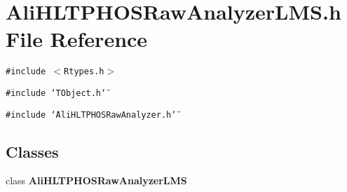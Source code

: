 \section{Ali\-HLTPHOSRaw\-Analyzer\-LMS.h File Reference}
\label{AliHLTPHOSRawAnalyzerLMS_8h}
{\tt \#include $<$Rtypes.h$>$}\par
{\tt \#include \char`\"{}TObject.h\char`\"{}}\par
{\tt \#include \char`\"{}Ali\-HLTPHOSRaw\-Analyzer.h\char`\"{}}\par
\subsection*{Classes}
\begin{CompactItemize}
\item 
class {\bf Ali\-HLTPHOSRaw\-Analyzer\-LMS}
\end{CompactItemize}
